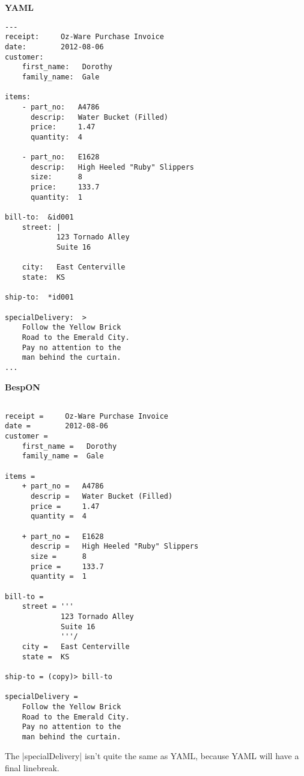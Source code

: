 \documentclass[11pt]{article}
\begin{document}
{{\begin{appendices}
\begin{tcolorbox}{}
\begin{multicols}{2}
\centering \textbf{YAML}
\begin{Verbatim}[formatcom=\color{DarkGreen}]
---
receipt:     Oz-Ware Purchase Invoice
date:        2012-08-06
customer:
    first_name:   Dorothy
    family_name:  Gale

items:
    - part_no:   A4786
      descrip:   Water Bucket (Filled)
      price:     1.47
      quantity:  4

    - part_no:   E1628
      descrip:   High Heeled "Ruby" Slippers
      size:      8
      price:     133.7
      quantity:  1

bill-to:  &id001
    street: |
            123 Tornado Alley
            Suite 16

    city:   East Centerville
    state:  KS

ship-to:  *id001

specialDelivery:  >
    Follow the Yellow Brick
    Road to the Emerald City.
    Pay no attention to the
    man behind the curtain.
...
\end{Verbatim}
\columnbreak
\centering \textbf{BespON}

\begin{Verbatim}

receipt =     Oz-Ware Purchase Invoice
date =        2012-08-06
customer =
    first_name =   Dorothy
    family_name =  Gale

items =
    + part_no =   A4786
      descrip =   Water Bucket (Filled)
      price =     1.47
      quantity =  4

    + part_no =   E1628
      descrip =   High Heeled "Ruby" Slippers
      size =      8
      price =     133.7
      quantity =  1

bill-to =
    street = '''
             123 Tornado Alley
             Suite 16
             '''/
    city =   East Centerville
    state =  KS

ship-to = (copy)> bill-to

specialDelivery = 
    Follow the Yellow Brick
    Road to the Emerald City.
    Pay no attention to the
    man behind the curtain.

\end{Verbatim}
\end{multicols}
\end{tcolorbox}
The |specialDelivery| isn't quite the same as YAML, because YAML will have a final linebreak.



\begin{tcolorbox}{}
\begin{multicols}{2}


\end{multicols}
\end{tcolorbox}
\end{appendices}}}
\end{document}
